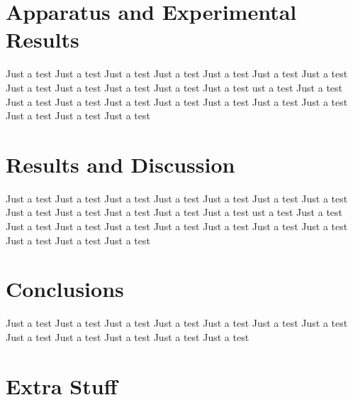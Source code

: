 \documentclass{IIBproject}
\begin{document}
\section{Apparatus and Experimental Results}
Just a test Just a test Just a test Just a test Just a test Just a test 
Just a test Just a test Just a test Just a test Just a test Just a test 
ust a test Just a test Just a test Just a test Just a test Just a test 
Just a test Just a test Just a test Just a test Just a test Just a test 

\section{Results and Discussion}
Just a test Just a test Just a test Just a test Just a test Just a test 
Just a test Just a test Just a test Just a test Just a test Just a test 
ust a test Just a test Just a test Just a test Just a test Just a test 
Just a test Just a test Just a test Just a test Just a test Just a test 

\section{Conclusions}
Just a test Just a test Just a test Just a test Just a test Just a test 
Just a test Just a test Just a test Just a test Just a test Just a test 

%

\appendix

\section{Extra Stuff}
\end{document}

